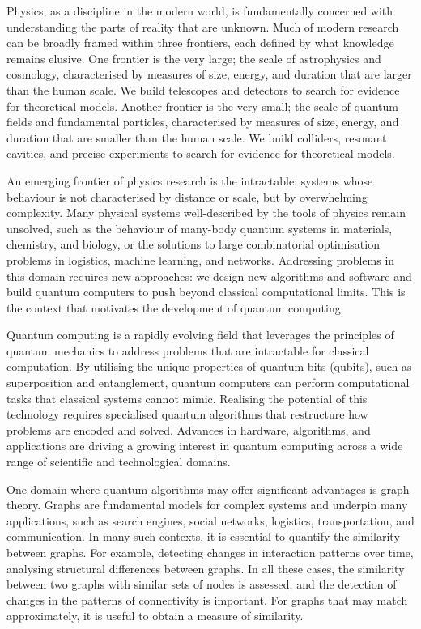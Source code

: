 Physics, as a discipline in the modern world, is fundamentally concerned with understanding the parts of reality that are unknown. Much of modern research can be broadly framed within three frontiers, each defined by what knowledge remains elusive. 
One frontier is the very large; the scale of astrophysics and cosmology, characterised by measures of size, energy, and duration that are larger than the human scale. We build telescopes and detectors to search for evidence for theoretical models. 
Another frontier is the very small; the scale of quantum fields and fundamental particles, characterised by measures of size, energy, and duration that are smaller than the human scale. We build colliders, resonant cavities, and precise experiments to search for evidence for theoretical models. 

An emerging frontier of physics research is the intractable; systems whose behaviour is not characterised by distance or scale, but by overwhelming complexity. Many physical systems well-described by the tools of physics remain unsolved, such as the behaviour of many-body quantum systems in materials, chemistry, and biology, or the solutions to large combinatorial optimisation problems in logistics, machine learning, and networks. Addressing problems in this domain requires new approaches: we design new algorithms and software and build quantum computers to push beyond classical computational limits. This is the context that motivates the development of quantum computing.

Quantum computing is a rapidly evolving field that leverages the principles of quantum mechanics to address problems that are intractable for classical computation. By utilising the unique properties of quantum bits (qubits), such as superposition and entanglement, quantum computers can perform computational tasks that classical systems cannot mimic. Realising the potential of this technology requires specialised quantum algorithms that restructure how problems are encoded and solved. Advances in hardware, algorithms, and applications are driving a growing interest in quantum computing across a wide range of scientific and technological domains.

One domain where quantum algorithms may offer significant advantages is graph theory.  Graphs are fundamental models for complex systems and underpin many applications, such as search engines, social networks, logistics, transportation, and communication. In many such contexts, it is essential to quantify the similarity between graphs.
For example, detecting changes in interaction patterns over time, analysing structural differences between graphs.
In all these cases, the similarity between two graphs with similar sets of nodes is assessed, and the detection of changes in the patterns of connectivity is important. For graphs that may match approximately, it is useful to obtain a measure of similarity.

